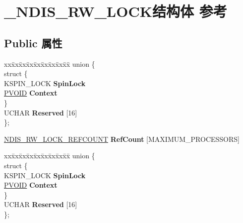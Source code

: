 \hypertarget{struct___n_d_i_s___r_w___l_o_c_k}{}\section{\+\_\+\+N\+D\+I\+S\+\_\+\+R\+W\+\_\+\+L\+O\+C\+K结构体 参考}
\label{struct___n_d_i_s___r_w___l_o_c_k}
\subsection*{Public 属性}
\begin{DoxyCompactItemize}
\item 
\mbox{\label{struct___n_d_i_s___r_w___l_o_c_k_a4dc2ef8de1af822643df3d07581613ec}} 
\begin{tabbing}
xx\=xx\=xx\=xx\=xx\=xx\=xx\=xx\=xx\=\kill
union \{\\
\mbox{\label{union___n_d_i_s___r_w___l_o_c_k_1_1_0D899_a365023b6918721b626b86d2bf83d3cd3}} 
\>struct \{\\
\>\>KSPIN\_LOCK {\bfseries SpinLock}\\
\>\>\hyperlink{interfacevoid}{PVOID} {\bfseries Context}\\
\>\} \\
\>UCHAR {\bfseries Reserved} \mbox{[}16\mbox{]}\\
\}; \\

\end{tabbing}\item 
\mbox{\label{struct___n_d_i_s___r_w___l_o_c_k_a635792223d7f38ec99580cd57e69e999}} 
\hyperlink{union___n_d_i_s___r_w___l_o_c_k___r_e_f_c_o_u_n_t}{N\+D\+I\+S\+\_\+\+R\+W\+\_\+\+L\+O\+C\+K\+\_\+\+R\+E\+F\+C\+O\+U\+NT} {\bfseries Ref\+Count} \mbox{[}M\+A\+X\+I\+M\+U\+M\+\_\+\+P\+R\+O\+C\+E\+S\+S\+O\+RS\mbox{]}
\item 
\mbox{\label{struct___n_d_i_s___r_w___l_o_c_k_ac8d0a912a251442c25762032eac6af80}} 
\begin{tabbing}
xx\=xx\=xx\=xx\=xx\=xx\=xx\=xx\=xx\=\kill
union \{\\
\mbox{\label{union___n_d_i_s___r_w___l_o_c_k_1_1_0D1076_a2ea1a562ec77cb8cf2d6ad86aba970ab}} 
\>struct \{\\
\>\>KSPIN\_LOCK {\bfseries SpinLock}\\
\>\>\hyperlink{interfacevoid}{PVOID} {\bfseries Context}\\
\>\} \\
\>UCHAR {\bfseries Reserved} \mbox{[}16\mbox{]}\\
\}; \\


\end{tabbing}
\end{DoxyCompactItemize}
